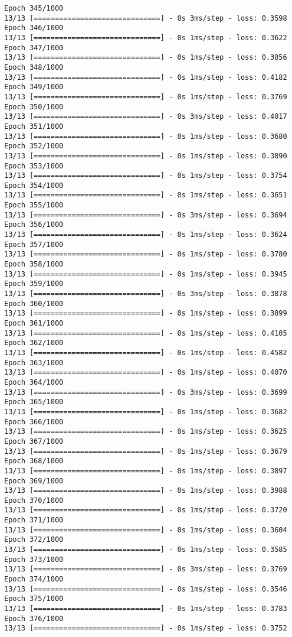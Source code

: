 \documentclass[11pt]{article}
\begin{document}
\begin{Verbatim}[commandchars=\\\{\}]
Epoch 345/1000
13/13 [==============================] - 0s 3ms/step - loss: 0.3598
Epoch 346/1000
13/13 [==============================] - 0s 1ms/step - loss: 0.3622
Epoch 347/1000
13/13 [==============================] - 0s 1ms/step - loss: 0.3856
Epoch 348/1000
13/13 [==============================] - 0s 1ms/step - loss: 0.4182
Epoch 349/1000
13/13 [==============================] - 0s 1ms/step - loss: 0.3769
Epoch 350/1000
13/13 [==============================] - 0s 3ms/step - loss: 0.4017
Epoch 351/1000
13/13 [==============================] - 0s 1ms/step - loss: 0.3680
Epoch 352/1000
13/13 [==============================] - 0s 1ms/step - loss: 0.3890
Epoch 353/1000
13/13 [==============================] - 0s 1ms/step - loss: 0.3754
Epoch 354/1000
13/13 [==============================] - 0s 1ms/step - loss: 0.3651
Epoch 355/1000
13/13 [==============================] - 0s 3ms/step - loss: 0.3694
Epoch 356/1000
13/13 [==============================] - 0s 1ms/step - loss: 0.3624
Epoch 357/1000
13/13 [==============================] - 0s 1ms/step - loss: 0.3780
Epoch 358/1000
13/13 [==============================] - 0s 1ms/step - loss: 0.3945
Epoch 359/1000
13/13 [==============================] - 0s 3ms/step - loss: 0.3878
Epoch 360/1000
13/13 [==============================] - 0s 1ms/step - loss: 0.3899
Epoch 361/1000
13/13 [==============================] - 0s 1ms/step - loss: 0.4105
Epoch 362/1000
13/13 [==============================] - 0s 1ms/step - loss: 0.4582
Epoch 363/1000
13/13 [==============================] - 0s 1ms/step - loss: 0.4070
Epoch 364/1000
13/13 [==============================] - 0s 3ms/step - loss: 0.3699
Epoch 365/1000
13/13 [==============================] - 0s 1ms/step - loss: 0.3682
Epoch 366/1000
13/13 [==============================] - 0s 1ms/step - loss: 0.3625
Epoch 367/1000
13/13 [==============================] - 0s 1ms/step - loss: 0.3679
Epoch 368/1000
13/13 [==============================] - 0s 1ms/step - loss: 0.3897
Epoch 369/1000
13/13 [==============================] - 0s 1ms/step - loss: 0.3988
Epoch 370/1000
13/13 [==============================] - 0s 1ms/step - loss: 0.3720
Epoch 371/1000
13/13 [==============================] - 0s 1ms/step - loss: 0.3604
Epoch 372/1000
13/13 [==============================] - 0s 1ms/step - loss: 0.3585
Epoch 373/1000
13/13 [==============================] - 0s 3ms/step - loss: 0.3769
Epoch 374/1000
13/13 [==============================] - 0s 1ms/step - loss: 0.3546
Epoch 375/1000
13/13 [==============================] - 0s 1ms/step - loss: 0.3783
Epoch 376/1000
13/13 [==============================] - 0s 1ms/step - loss: 0.3752

\end{Verbatim}
\end{document}
